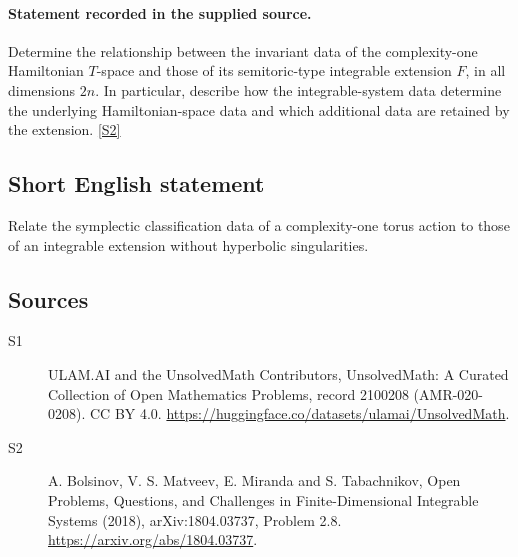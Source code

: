 \documentclass[11pt]{article}
\newcommand{\sref}[2]{\hyperlink{source:#1:#2}{[S#2]}}
\begin{document}
\paragraph{Statement recorded in the supplied source.}
Determine the relationship between the invariant data of the complexity-one Hamiltonian $T$-space and those of its semitoric-type integrable extension $F$, in all dimensions $2n$. In particular, describe how the integrable-system data determine the underlying Hamiltonian-space data and which additional data are retained by the extension. \sref{2100208}{2}
\subsection{Short English statement}
Relate the symplectic classification data of a complexity-one torus action to those of an integrable extension without hyperbolic singularities.
\subsection{Sources}
\begin{description}
\item[\hypertarget{source:2100208:1}{S1}] ULAM.AI and the UnsolvedMath Contributors, UnsolvedMath: A Curated Collection of Open Mathematics Problems, record 2100208 (AMR-020-0208). CC BY 4.0. \url{https://huggingface.co/datasets/ulamai/UnsolvedMath}.
\item[\hypertarget{source:2100208:2}{S2}] A. Bolsinov, V. S. Matveev, E. Miranda and S. Tabachnikov, Open Problems, Questions, and Challenges in Finite-Dimensional Integrable Systems (2018), arXiv:1804.03737, Problem 2.8. \url{https://arxiv.org/abs/1804.03737}.
\end{description}
\label{end:2100208}
\end{document}
